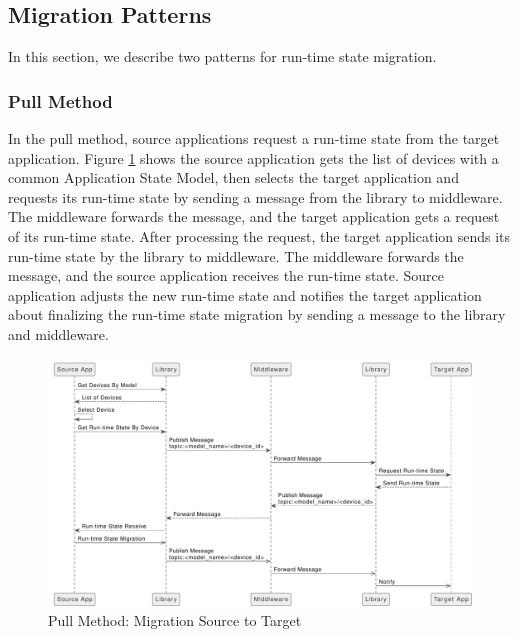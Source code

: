 \subsection{Migration Patterns}
In this section, we describe two patterns for run-time state migration.

\subsubsection{Pull Method}
In the pull method, source applications request a run-time state from the target application. Figure \ref{fig:Migration-Source-to-Target-Pull-Method} shows the source application gets the list of devices with a common Application State Model, then selects the target application and requests its run-time state by sending a message from the library to middleware. The middleware forwards the message, and the target application gets a request of its run-time state. After processing the request, the target application sends its run-time state by the library to middleware. The middleware forwards the message, and the source application receives the run-time state. Source application adjusts the new run-time state and notifies the target application about finalizing the run-time state migration by sending a message to the library and middleware. 

\FloatBarrier \begin{figure}[H]
    \includegraphics[width=\linewidth]{../figures/Migration-Source-to-Target-Pull-Method.pdf}
    \centering
    \caption{Pull Method: Migration Source to Target}
    \label{fig:Migration-Source-to-Target-Pull-Method}
\end{figure} \FloatBarrier

